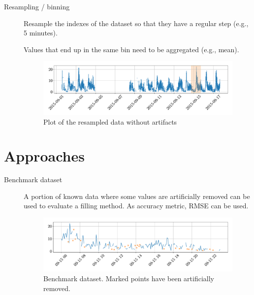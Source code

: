 \begin{description}
    \item[Resampling / binning]  
        Resample the indexes of the dataset so that they have a regular step (e.g., 5 minutes).

        \begin{remark}
            Values that end up in the same bin need to be aggregated (e.g., mean).
        \end{remark}

        \begin{figure}[H]
            \centering
            \includegraphics[width=0.8\linewidth]{./img/_md_traffic_resampled.pdf}
            \caption{
                Plot of the resampled data without artifacts
            }
        \end{figure}
\end{description}



\section{Approaches}

\begin{description}
    \item[Benchmark dataset] 
        A portion of known data where some values are artificially removed can be used to evaluate a filling method. As accuracy metric, RMSE can be used.

        \begin{figure}[H]
            \centering
            \includegraphics[width=0.8\linewidth]{./img/_md_traffic_eval_data.pdf}
            \caption{Benchmark dataset. Marked points have been artificially removed.}
        \end{figure}
\end{description}


